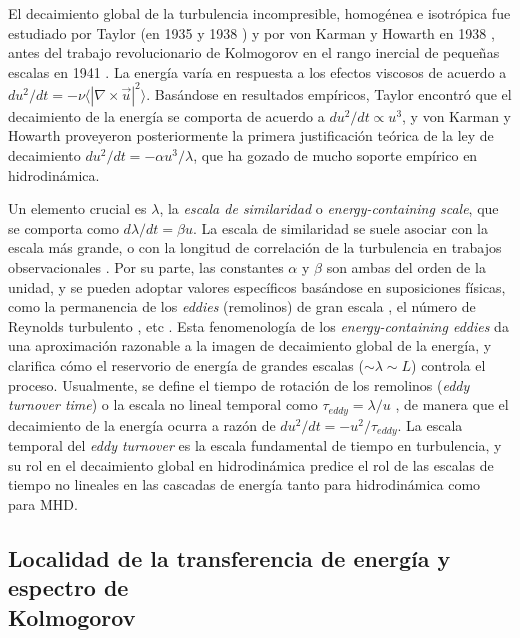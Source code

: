 El decaimiento global de la turbulencia incompresible, homogénea e
isotrópica fue estudiado por Taylor (en 1935
\cite{taylor_statistical_1935} y 1938 \cite{taylor_spectrum_1938}) y
por von Karman y Howarth en 1938 \cite{von_karman_statistical_1938},
antes del trabajo revolucionario de Kolmogorov en el rango inercial de
pequeñas escalas en 1941
\cite{kolmogorov_local_1941,kolmogorov_decay_1941}. La energía varía
en respuesta a los efectos viscosos de acuerdo a $du^2/dt = -\nu
\langle\left|\nabla\times\vec{u}\right|^2\rangle$. Basándose en
resultados empíricos, Taylor encontró que el decaimiento de la energía
se comporta de acuerdo a $du^2/dt \propto u^3$, y von Karman y Howarth
\cite{von_karman_statistical_1938} proveyeron posteriormente la
primera justificación teórica de la ley de decaimiento $du^2/dt =
-\alpha u^3/\lambda$, que ha gozado de mucho soporte empírico en
hidrodinámica.

Un elemento crucial es $\lambda$, la \textit{escala de similaridad} o
\textit{energy-containing scale}, que se comporta como $d\lambda/dt =
\beta u$. La escala de similaridad se suele asociar con la escala más
grande, o con la longitud de correlación de la turbulencia en trabajos
observacionales \cite{batchelor_theory_1953}.  Por su parte, las
constantes $\alpha$ y $\beta$ son ambas del orden de la unidad, y se
pueden adoptar valores específicos basándose en suposiciones físicas,
como la permanencia de los \textit{eddies} (remolinos) de gran escala
\cite{kolmogorov_energy-scattering_1941}, el número de Reynolds
turbulento \cite{von_karman_concept_1949}, etc
\cite{orszag_analytical_1970,matthaeus_anisotropic_1996}. Esta
fenomenología de los \textit{energy-containing eddies}
da una aproximación razonable a la imagen de decaimiento global de la
energía, y clarifica cómo el reservorio de energía de grandes escalas
($\sim \lambda \sim L$) controla el proceso. Usualmente, se define el
tiempo de rotación de los remolinos (\textit{eddy turnover time}) o la
escala no lineal temporal como $\tau_{eddy} = \lambda/u$
\cite{rose_fully_1978}, de manera que el decaimiento de la energía
ocurra a razón de $du^2/dt = -u^2/\tau_{eddy}$. La escala temporal del
\textit{eddy turnover} es la escala fundamental de tiempo en
turbulencia, y su rol en el decaimiento global en hidrodinámica
predice el rol de las escalas de tiempo no lineales en las cascadas de
energía tanto para hidrodinámica como para MHD.

\subsection{Localidad de la transferencia de energía y espectro de\\ Kolmogorov}

